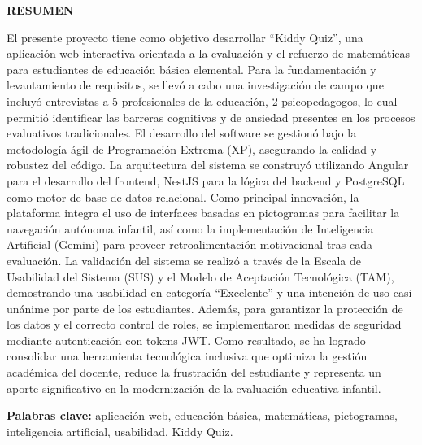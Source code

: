 \begin{center}
    \vspace*{0.5cm}
    {\bfseries RESUMEN}
\end{center}
\vspace{0.8cm}

\justifying
\noindent
El presente proyecto tiene como objetivo desarrollar ``Kiddy Quiz'', una aplicación web interactiva orientada a la evaluación y el refuerzo de matemáticas para estudiantes de educación básica elemental. Para la fundamentación y levantamiento de requisitos, se llevó a cabo una investigación de campo que incluyó entrevistas a 5 profesionales de la educación, 2 psicopedagogos, lo cual permitió identificar las barreras cognitivas y de ansiedad presentes en los procesos evaluativos tradicionales. El desarrollo del software se gestionó bajo la metodología ágil de Programación Extrema (XP), asegurando la calidad y robustez del código. La arquitectura del sistema se construyó utilizando Angular para el desarrollo del frontend, NestJS para la lógica del backend y PostgreSQL como motor de base de datos relacional. Como principal innovación, la plataforma integra el uso de interfaces basadas en pictogramas para facilitar la navegación autónoma infantil, así como la implementación de Inteligencia Artificial (Gemini) para proveer retroalimentación motivacional tras cada evaluación. La validación del sistema se realizó a través de la Escala de Usabilidad del Sistema (SUS) y el Modelo de Aceptación Tecnológica (TAM), demostrando una usabilidad en categoría ``Excelente'' y una intención de uso casi unánime por parte de los estudiantes. Además, para garantizar la protección de los datos y el correcto control de roles, se implementaron medidas de seguridad mediante autenticación con tokens JWT. Como resultado, se ha logrado consolidar una herramienta tecnológica inclusiva que optimiza la gestión académica del docente, reduce la frustración del estudiante y representa un aporte significativo en la modernización de la evaluación educativa infantil.

\vspace{0.5cm}

\noindent\textbf{Palabras clave:} aplicación web, educación básica, matemáticas, pictogramas, inteligencia artificial, usabilidad, Kiddy Quiz.

\newpage
